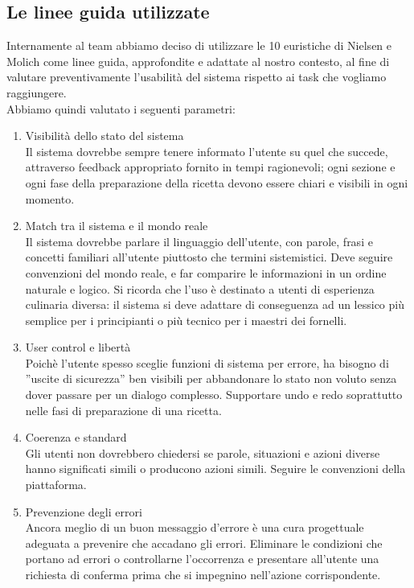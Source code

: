 \documentclass[12pt,a4paper,openright,twoside]{article}
\begin{document}
\subsection{Le linee guida utilizzate}
Internamente al team abbiamo deciso di utilizzare le 10 euristiche di Nielsen e Molich come linee guida, approfondite e adattate al nostro contesto, al fine di valutare preventivamente l’usabilità del sistema rispetto ai task che vogliamo raggiungere.\\
Abbiamo quindi valutato i seguenti parametri:
\begin{enumerate}

\item Visibilità dello stato del sistema\\
Il sistema dovrebbe sempre tenere informato l’utente su quel che succede,
attraverso feedback appropriato fornito in tempi ragionevoli; ogni sezione e ogni fase della preparazione della ricetta devono essere chiari e visibili in ogni momento.

\item Match tra il sistema e il mondo reale\\
Il sistema dovrebbe parlare il linguaggio dell’utente, con parole, frasi e
concetti familiari all’utente piuttosto che termini sistemistici. Deve seguire
convenzioni del mondo reale, e far comparire le informazioni in un ordine
naturale e logico. Si ricorda che l'uso è destinato a utenti di esperienza culinaria diversa: il sistema si deve adattare di conseguenza ad un lessico più semplice per i principianti o più tecnico per i maestri dei fornelli. \\

\item User control e libertà\\
Poichè l’utente spesso sceglie funzioni di sistema per errore, ha bisogno
di ”uscite di sicurezza” ben visibili per abbandonare lo stato non voluto
senza dover passare per un dialogo complesso. Supportare undo e redo soprattutto nelle fasi di preparazione di una ricetta.\\

\item Coerenza e standard\\
Gli utenti non dovrebbero chiedersi se parole, situazioni e azioni diverse
hanno significati simili o producono azioni simili. Seguire le convenzioni
della piattaforma.\\

\item Prevenzione degli errori\\
Ancora meglio di un buon messaggio d’errore è una cura progettuale adeguata a prevenire che accadano gli errori. Eliminare le condizioni che portano ad errori o controllarne l’occorrenza e presentare all’utente una richiesta di conferma prima che si impegnino nell’azione corrispondente.\\


\end{enumerate}
\end{document}
